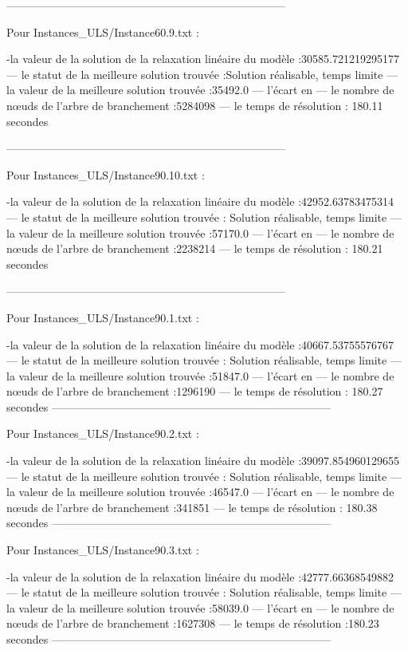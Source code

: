 ---------------------------------------------------------------------------

Pour Instances_ULS/Instance60.9.txt :


-la valeur de la solution de la relaxation linéaire du modèle :30585.721219295177
— le statut de la meilleure solution trouvée :Solution réalisable, temps limite 
— la valeur de la meilleure solution trouvée :35492.0
— l’écart en %
— le nombre de nœuds de l’arbre de branchement :5284098
— le temps de résolution : 180.11 secondes


---------------------------------------------------------------------------

Pour Instances_ULS/Instance90.10.txt :


-la valeur de la solution de la relaxation linéaire du modèle :42952.63783475314
— le statut de la meilleure solution trouvée : Solution réalisable, temps limite 
— la valeur de la meilleure solution trouvée :57170.0
— l’écart en %
— le nombre de nœuds de l’arbre de branchement :2238214
— le temps de résolution : 180.21 secondes

---------------------------------------------------------------------------

Pour Instances_ULS/Instance90.1.txt :


-la valeur de la solution de la relaxation linéaire du modèle :40667.53755576767
— le statut de la meilleure solution trouvée : Solution réalisable, temps limite 
— la valeur de la meilleure solution trouvée :51847.0
— l’écart en %
— le nombre de nœuds de l’arbre de branchement :1296190
— le temps de résolution : 180.27 secondes
---------------------------------------------------------------------------

Pour Instances_ULS/Instance90.2.txt :


-la valeur de la solution de la relaxation linéaire du modèle :39097.854960129655
— le statut de la meilleure solution trouvée : Solution réalisable, temps limite 
— la valeur de la meilleure solution trouvée :46547.0
— l’écart en %
— le nombre de nœuds de l’arbre de branchement :341851
— le temps de résolution : 180.38 secondes
---------------------------------------------------------------------------

Pour Instances_ULS/Instance90.3.txt :


-la valeur de la solution de la relaxation linéaire du modèle :42777.66368549882
— le statut de la meilleure solution trouvée : Solution réalisable, temps limite 
— la valeur de la meilleure solution trouvée :58039.0
— l’écart en %
— le nombre de nœuds de l’arbre de branchement :1627308
— le temps de résolution :180.23 secondes
---------------------------------------------------------------------------

